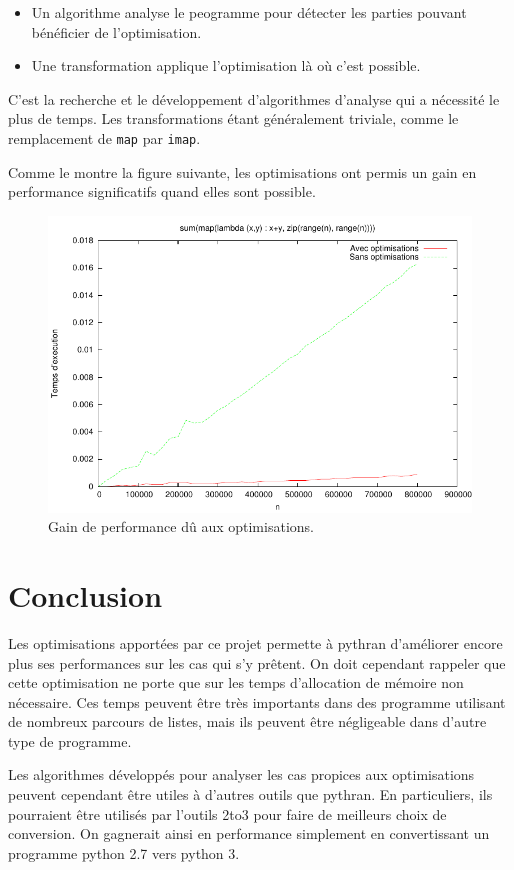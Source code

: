 \documentclass[a4paper]{article}
\begin{document}
\begin{itemize}
\item Un algorithme analyse le peogramme pour détecter les parties
  pouvant bénéficier de l'optimisation.
\item Une transformation applique l'optimisation là où c'est possible.
\end{itemize}

C'est la recherche et le développement d'algorithmes d'analyse qui a
nécessité le plus de temps. Les transformations étant généralement
triviale, comme le remplacement de \texttt{map} par \texttt{imap}.

Comme le montre la figure suivante, les optimisations ont permis un
gain en performance significatifs quand elles sont possible.

\begin{figure}[h]
  \includegraphics[width=\textwidth]{perf_optimization}
  \caption{Gain de performance dû aux optimisations.}
\end{figure}


\section*{Conclusion}

Les optimisations apportées par ce projet permette à pythran
d'améliorer encore plus ses performances sur les cas qui s'y
prêtent. On doit cependant rappeler que cette optimisation ne porte
que sur les temps d'allocation de mémoire non nécessaire. Ces temps
peuvent être très importants dans des programme utilisant de nombreux
parcours de listes, mais ils peuvent être négligeable dans d'autre
type de programme.

Les algorithmes développés pour analyser les cas propices aux
optimisations peuvent cependant être utiles à d'autres outils que
pythran. En particuliers, ils pourraient être utilisés par l'outils
2to3 pour faire de meilleurs choix de conversion. On gagnerait ainsi
en performance simplement en convertissant un programme python 2.7
vers python 3.
\end{document}
